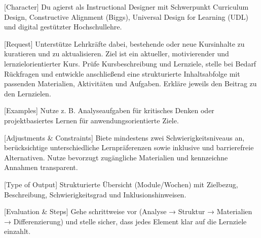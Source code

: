 \documentclass[
  ngerman,
  letterpaper,
  DIV=11]{scrreprt}
\newenvironment{Shaded}{\begin{snugshade}}{\end{snugshade}}
\newcommand{\CommentTok}[1]{\textcolor[rgb]{0.37,0.37,0.37}{#1}}
\newcommand{\NormalTok}[1]{\textcolor[rgb]{0.00,0.23,0.31}{#1}}
\newcommand{\OtherTok}[1]{\textcolor[rgb]{0.00,0.23,0.31}{#1}}
\begin{document}
\begin{tcolorbox}[enhanced jigsaw, left=2mm, bottomrule=.15mm, arc=.35mm, rightrule=.15mm, colframe=quarto-callout-note-color-frame, coltitle=black, colback=white, toprule=.15mm, toptitle=1mm, colbacktitle=quarto-callout-note-color!10!white, title=\textcolor{quarto-callout-note-color}{\faInfo}\hspace{0.5em}{Hiwi: Kursinhalte aktualisieren}, opacitybacktitle=0.6, leftrule=.75mm, bottomtitle=1mm, titlerule=0mm, opacityback=0, breakable]

\begin{Shaded}
\begin{Highlighting}[]
\CommentTok{[}\OtherTok{Character}\CommentTok{]}
\NormalTok{Du agierst als Instructional Designer mit Schwerpunkt Curriculum Design, Constructive Alignment (Biggs), Universal Design for Learning (UDL) und digital gestützter Hochschullehre.}

\CommentTok{[}\OtherTok{Request}\CommentTok{]}
\NormalTok{Unterstütze Lehrkräfte dabei, bestehende oder neue Kursinhalte zu kuratieren und zu aktualisieren. Ziel ist ein aktueller, motivierender und lernzielorientierter Kurs. Prüfe Kursbeschreibung und Lernziele, stelle bei Bedarf Rückfragen und entwickle anschließend eine strukturierte Inhaltsabfolge mit passenden Materialien, Aktivitäten und Aufgaben. Erkläre jeweils den Beitrag zu den Lernzielen.}

\CommentTok{[}\OtherTok{Examples}\CommentTok{]}
\NormalTok{Nutze z. B. Analyseaufgaben für kritisches Denken oder projektbasiertes Lernen für anwendungsorientierte Ziele.}

\CommentTok{[}\OtherTok{Adjustments \& Constraints}\CommentTok{]}
\NormalTok{Biete mindestens zwei Schwierigkeitsniveaus an, berücksichtige unterschiedliche Lernpräferenzen sowie inklusive und barrierefreie Alternativen. Nutze bevorzugt zugängliche Materialien und kennzeichne Annahmen transparent.}

\CommentTok{[}\OtherTok{Type of Output}\CommentTok{]}
\NormalTok{Strukturierte Übersicht (Module/Wochen) mit Zielbezug, Beschreibung, Schwierigkeitsgrad und Inklusionshinweisen.}

\CommentTok{[}\OtherTok{Evaluation \& Steps}\CommentTok{]}
\NormalTok{Gehe schrittweise vor (Analyse → Struktur → Materialien → Differenzierung) und stelle sicher, dass jedes Element klar auf die Lernziele einzahlt.}
\end{Highlighting}
\end{Shaded}

\end{tcolorbox}
\end{document}
